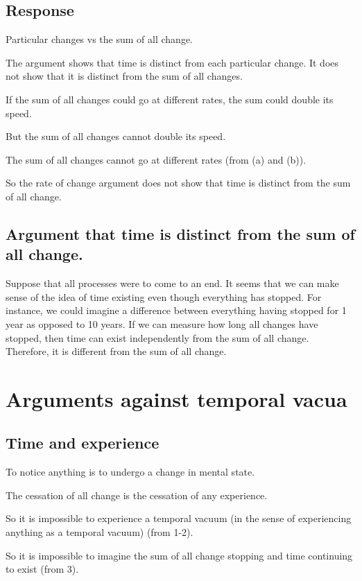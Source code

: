 \documentclass[oneside]{article}
\begin{document}
\subsection{Response}
\begin{enumerate*}
\item Particular changes vs the sum of all change. 
\item The argument shows that time is distinct from each particular change. It does not show that it is distinct from the sum of all changes. 
\begin{enumerate*}

\item If the sum of all changes could go at different rates, the sum could double its speed. 
\item But the sum of all changes cannot double its speed.
\item The sum of all changes cannot go at different rates (from (a) and (b)).  
\end{enumerate*}
\item So the rate of change argument does not show that time is distinct from the sum of all change.
\end{enumerate*}

\subsection{Argument that time is distinct from the sum of all change.}

Suppose that all processes were to come to an end. It seems that we can make sense of the idea of time existing even though everything has stopped. For instance, we could imagine a difference between everything having stopped for 1 year as opposed to 10 years. If we can measure how long all changes have stopped, then time can exist independently from the sum of all change. Therefore, it is different from the sum of all change.

\section{Arguments against temporal vacua}

\subsection{Time and experience}
\begin{enumerate*}
\item To notice anything is to undergo a change in mental state.
\item The cessation of all change is the cessation of any experience. 
\item So it is impossible to experience a temporal vacuum (in the sense of experiencing anything as a temporal vacuum) (from 1-2). 
\item So it is impossible to imagine the sum of all change stopping and time continuing to exist (from 3). 
\end{enumerate*}
\end{document}
